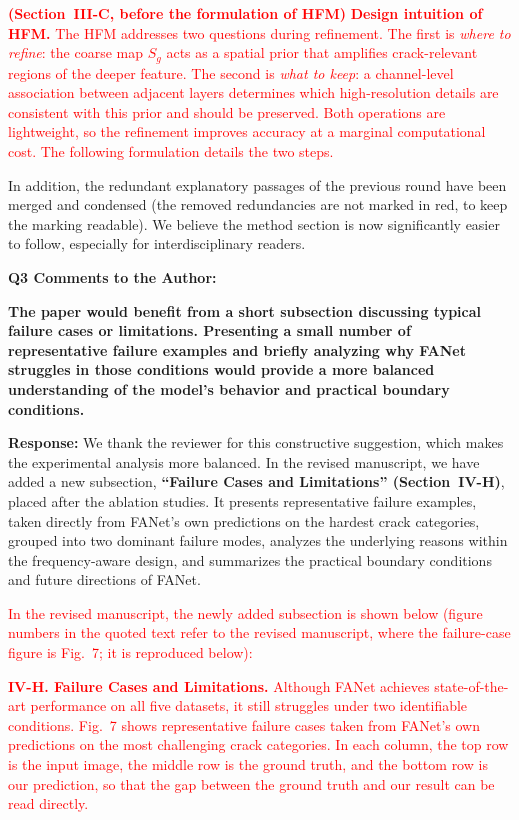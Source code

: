 \documentclass[lettersize,journal,onecolumn,12pt]{IEEEtran}
\begin{document}
\textcolor{red}{
\textbf{(Section~III-C, before the formulation of HFM)}
\textbf{Design intuition of HFM.} The HFM addresses two questions during refinement. The first is \emph{where to
refine}: the coarse map $S_g$ acts as a spatial prior that amplifies crack-relevant regions of the deeper feature.
The second is \emph{what to keep}: a channel-level association between adjacent layers determines which
high-resolution details are consistent with this prior and should be preserved. Both operations are lightweight, so
the refinement improves accuracy at a marginal computational cost. The following formulation details the two steps.
}

In addition, the redundant explanatory passages of the previous round have been merged and condensed (the removed
redundancies are not marked in red, to keep the marking readable). We believe the method section is now
significantly easier to follow, especially for interdisciplinary readers.\\[10pt]



{\color{BlueGreen} \textbf{Q3 Comments to the Author:}

\textbf{The paper would benefit from a short subsection discussing typical failure cases or limitations. Presenting a
small number of representative failure examples and briefly analyzing why FANet struggles in those conditions would
provide a more balanced understanding of the model's behavior and practical boundary conditions.}}

\textbf{Response:}
We thank the reviewer for this constructive suggestion, which makes the experimental analysis more balanced.
In the revised manuscript, we have added a new subsection, \textbf{``Failure Cases and Limitations''
(Section~IV-H)}, placed after the ablation studies. It presents representative failure examples, taken directly
from FANet's own predictions on the hardest crack categories, grouped into two dominant failure modes, analyzes
the underlying reasons within the frequency-aware design, and summarizes the practical boundary conditions and future
directions of FANet.

\textcolor{red}{In the revised manuscript, the newly added subsection is shown below (figure numbers in the quoted text refer to the revised manuscript, where the failure-case figure is Fig.~7; it is reproduced below):}

\textcolor{red}{
\textbf{IV-H. Failure Cases and Limitations.}
Although FANet achieves state-of-the-art performance on all five datasets, it still struggles under two identifiable
conditions. Fig.~7 shows representative failure cases taken from FANet's own predictions on the most challenging crack
categories. In each column, the top row is the input image, the middle row is the ground truth, and the bottom row is
our prediction, so that the gap between the ground truth and our result can be read directly.
}
\end{document}
